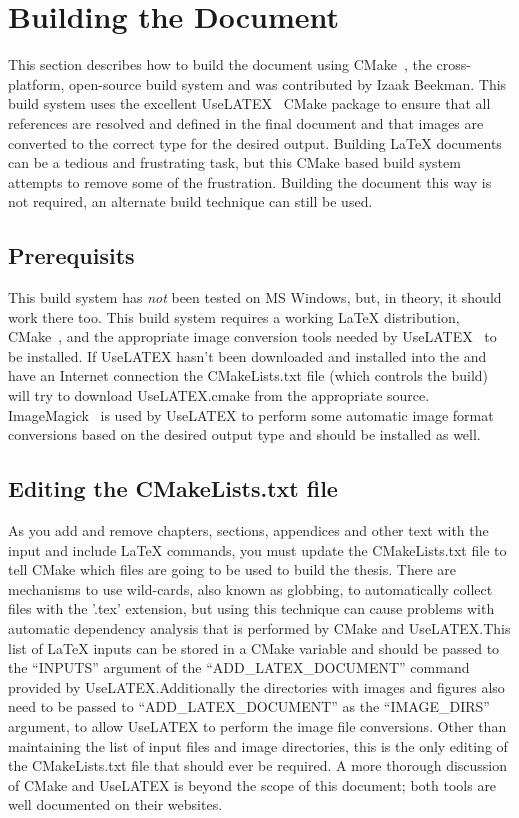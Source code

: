 \chapter{Building the Document\label{ch:building}}

This section describes how to build the document using CMake~\cite{CMake}, the
cross-platform, open-source build system and was contributed by Izaak
Beekman. This build system uses the excellent UseLATEX~\cite{UseLATEX}
CMake package to ensure that all references are resolved and defined
in the final document and that images are converted to the correct
type for the desired output. Building \LaTeX{} documents can be a
tedious and frustrating task, but this CMake based build system
attempts to remove some of the frustration. Building the
document this way is not required, an alternate build technique can
still be used.

\section{Prerequisits}
\label{sec:building:prerequisits}

This build system has \emph{not} been tested on MS Windows, but, in
theory, it should work there too. This build system requires a
working \LaTeX{} distribution, CMake~\cite{CMake}, and the appropriate
image conversion tools needed by UseLATEX~\cite{UseLATEX} to be installed.
If UseLATEX hasn't been downloaded and installed into the and have an Internet connection the
CMakeLists.txt file (which controls the build) will try to download
UseLATEX.cmake from the appropriate
source. ImageMagick~\cite{ImageMagick} is used by UseLATEX to perform
some automatic image format conversions based on the desired output
type and should be installed as well.

\section{Editing the CMakeLists.txt file}
\label{sec:building:cmakelists}

As you add and remove chapters, sections, appendices and other text
with the input and include \LaTeX{} commands, you must update the
CMakeLists.txt file to tell CMake which files are going to be used to
build the thesis. There are mechanisms to use wild-cards, also known
as globbing, to automatically collect files with the '.tex' extension,
but using this technique can cause problems with automatic dependency
analysis that is performed by CMake and UseLATEX.\@ This list of
\LaTeX{} inputs can be stored in a CMake variable and should be passed to the
``INPUTS'' argument of the ``ADD\_LATEX\_DOCUMENT'' command provided
by UseLATEX.\@ Additionally the directories with images and figures also
need to be passed to ``ADD\_LATEX\_DOCUMENT'' as the ``IMAGE\_DIRS''
argument, to allow UseLATEX to perform the image file
conversions. Other than maintaining the list of input files and image
directories, this is the only editing of the CMakeLists.txt file that
should ever be required. A more thorough discussion of CMake and
UseLATEX is beyond the scope of this document; both tools are well
documented on their websites.

